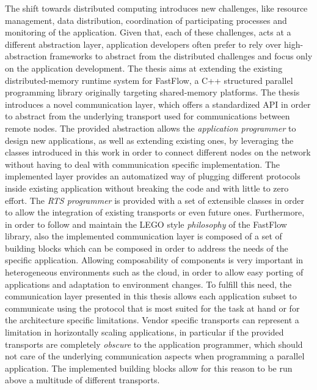 \documentclass[12pt]{article}
\begin{document}
The shift towards distributed computing introduces new challenges, like resource management, data distribution, coordination of participating processes and monitoring of the application. Given that, each of these challenges, acts at a different abstraction layer, application developers often prefer to rely over high-abstraction frameworks to abstract from the distributed challenges and focus only on the application development.\newline
{}
The thesis aims at extending the existing distributed-memory runtime system for FastFlow, a C++ structured parallel programming library originally targeting shared-memory platforms. The thesis introduces a novel communication layer, which offers a standardized API in order to abstract from the underlying transport used for communications between remote nodes. The provided abstraction allows the \textit{application programmer} to design new applications, as well as extending existing ones, by leveraging the classes introduced in this work in order to connect different nodes on the network without having to deal with communication specific implementation. The implemented layer provides an automatized way of plugging different protocols inside existing application without breaking the code and with little to zero effort. The \textit{RTS programmer} is provided with a set of extensible classes in order to allow the integration of existing transports or even future ones. Furthermore, in order to follow and maintain the LEGO style \textit{philosophy} of the FastFlow library, also the implemented communication layer is composed of a set of building blocks which can be composed in order to address the needs of the specific application. Allowing composability of components is very important in heterogeneous environments such as the cloud, in order to allow easy porting of applications and adaptation to environment changes. To fulfill this need, the communication layer presented in this thesis allows each application subset to communicate using the protocol that is most suited for the task at hand or for the architecture specific limitations. Vendor specific transports can represent a limitation in horizontally scaling applications, in particular if the provided transports are completely \textit{obscure} to the application programmer, which should not care of the underlying communication aspects when programming a parallel application. The implemented building blocks allow for this reason to be run above a multitude of different transports.\newline\newline
\end{document}
